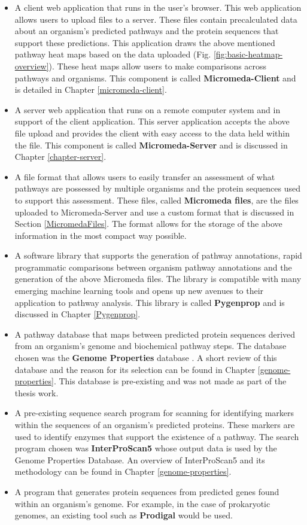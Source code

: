 \begin{itemize}
\item A client web application that runs in the user's browser. This web application allows users to upload files to a server. These files contain precalculated data about an organism's predicted pathways and the protein sequences that support these predictions. This application draws the above mentioned pathway heat maps based on the data uploaded (Fig. \ref{fig:basic-heatmap-overview}). These heat maps allow users to make comparisons across pathways and organisms. This component is called \textbf{Micromeda-Client} and is detailed in Chapter \ref{micromeda-client}.
\item A server web application that runs on a remote computer system and in support of the client application. This server application accepts the above file upload and provides the client with easy access to the data held within the file. This component is called \textbf{Micromeda-Server} and is discussed in Chapter \ref{chapter-server}.
\item A file format that allows users to easily transfer an assessment of what pathways are possessed by multiple organisms and the protein sequences used to support this assessment. These files, called \textbf{Micromeda files}, are the files uploaded to Micromeda-Server and use a custom format that is discussed in Section \ref{MicromedaFiles}. The format allows for the storage of the above information in the most compact way possible.
\item A software library that supports the generation of pathway annotations, rapid programmatic comparisons between organism pathway annotations and the generation of the above Micromeda files. The library is compatible with many emerging machine learning tools and opens up new avenues to their application to pathway analysis. This library is called \textbf{Pygenprop} and is discussed in Chapter \ref{Pygenprop}.
\item A pathway database that maps between predicted protein sequences derived from an organism's genome and biochemical pathway steps. The database chosen was the \textbf{Genome Properties} database \cite{richardson2018genome}. A short review of this database and the reason for its selection can be found in Chapter \ref{genome-properties}. This database is pre-existing and was not made as part of the thesis work.
\item A pre-existing sequence search program for scanning for identifying markers within the sequences of an organism's predicted proteins. These markers are used to identify enzymes that support the existence of a pathway. The search program chosen was \textbf{InterProScan5} whose output data is used by the Genome Properties Database. An overview of InterProScan5 \cite{jones2014interproscan} and its methodology can be found in Chapter \ref{genome-properties}.
\item A program that generates protein sequences from predicted genes found within an organism's genome. For example, in the case of prokaryotic genomes, an existing tool such as \textbf{Prodigal} \cite{hyatt2010prodigal} would be used. 
\end{itemize}

